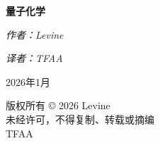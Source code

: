 \documentclass[12pt,a4paper,openany]{ctexbook}
\newcommand{\booktitle}{量子化学}    %
\newcommand{\bookauthor}{Levine}    %
\newcommand{\booktranslator}{TFAA} %
\newcommand{\bookdate}{2026年1月}    %
\begin{document}
\begin{titlepage}
    \centering
    \vspace*{5cm}          %
    {\Huge \bfseries \booktitle \par} %
    \vspace{2cm}           %
    {\Large \textit{作者：\bookauthor} \par} %
    {\Large \textit{译者：\booktranslator} \par}
    \vfill                 %
    {\large \quad \bookdate \par} %
\end{titlepage}

\newpage
\thispagestyle{empty}      %
\centering
\vspace*{8cm}
版权所有 © 2026 \bookauthor \\
未经许可，不得复制、转载或摘编 \\
\vfill
\booktranslator \\
\newpage

\tableofcontents  %
\newpage          %

\end{document}
